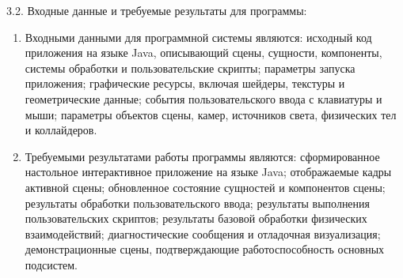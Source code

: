 {\parindent0pt
  3.2. Входные данные и требуемые результаты для программы:}

\begin{enumerate}
\item Входными данными для программной системы являются: исходный код приложения на языке Java, описывающий сцены, сущности, компоненты, системы обработки и пользовательские скрипты; параметры запуска приложения; графические ресурсы, включая шейдеры, текстуры и геометрические данные; события пользовательского ввода с клавиатуры и мыши; параметры объектов сцены, камер, источников света, физических тел и коллайдеров.
\item Требуемыми результатами работы программы являются: сформированное настольное интерактивное приложение на языке Java; отображаемые кадры активной сцены; обновленное состояние сущностей и компонентов сцены; результаты обработки пользовательского ввода; результаты выполнения пользовательских скриптов; результаты базовой обработки физических взаимодействий; диагностические сообщения и отладочная визуализация; демонстрационные сцены, подтверждающие работоспособность основных подсистем.
\end{enumerate}

